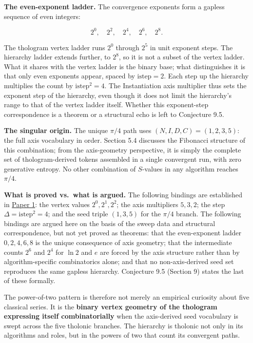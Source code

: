 \documentclass[12pt]{article}
\begin{document}
\textbf{The even-exponent ladder.} The convergence exponents form a
gapless sequence of even integers:

\[2^0, \quad 2^2, \quad 2^4, \quad 2^6, \quad 2^8.\]

The thologram vertex ladder runs \(2^0\) through \(2^5\) in unit
exponent steps. The hierarchy ladder extends further, to \(2^8\), so it
is not a subset of the vertex ladder. What it shares with the vertex
ladder is the binary base; what distinguishes it is that only even
exponents appear, spaced by \(\mathrm{istep} = 2\). Each step up the
hierarchy multiplies the count by \(\mathrm{istep}^2 = 4\). The
Instantiation axis multiplier thus sets the exponent step of the
hierarchy, even though it does not limit the hierarchy's range to that
of the vertex ladder itself. Whether this exponent-step correspondence
is a theorem or a structural echo is left to Conjecture 9.5.

\textbf{The singular origin.} The unique \(\pi/4\) path uses
\((N, I, D, C) = (1, 2, 3, 5)\): the full axis vocabulary in order.
Section 5.4 discusses the Fibonacci structure of this combination; from
the axis-geometry perspective, it is simply the complete set of
thologram-derived tokens assembled in a single convergent run, with zero
generative entropy. No other combination of \(S\)-values in any
algorithm reaches \(\pi/4\).

\textbf{What is proved vs.~what is argued.} The following bindings are
established in
\href{https://github.com/baardev/truevalue/blob/main/docnav/Research/papers/1_recursive-tholonic-five-constants/1_recursive-tholonic-five-constants.pdf}{Paper
1}: the vertex values \(2^0, 2^1, 2^2\); the axis multipliers
\(5, 3, 2\); the step \(\Delta = \mathrm{istep}^2 = 4\); and the seed
triple \((1, 3, 5)\) for the \(\pi/4\) branch. The following bindings
are argued here on the basis of the sweep data and structural
correspondence, but not yet proved as theorems: that the even-exponent
ladder \(0, 2, 4, 6, 8\) is the unique consequence of axis geometry;
that the intermediate counts \(2^6\) and \(2^4\) for \(\ln 2\) and \(e\)
are forced by the axis structure rather than by algorithm-specific
combinatorics alone; and that no non-axis-derived seed set reproduces
the same gapless hierarchy. Conjecture 9.5 (Section 9) states the last
of these formally.

The power-of-two pattern is therefore not merely an empirical curiosity
about five classical series. It is the \textbf{binary vertex geometry of
the thologram expressing itself combinatorially} when the axis-derived
seed vocabulary is swept across the five tholonic branches. The
hierarchy is tholonic not only in its algorithms and roles, but in the
powers of two that count its convergent paths.
\end{document}
